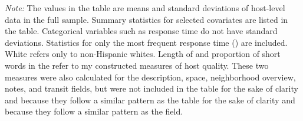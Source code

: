 \begin{table}[htbp]
\begin{center}
\begin{minipage}{6in}
{\it Note:} The values in the table are means and standard deviations of host-level data in the full sample. Summary statistics for selected covariates are listed in the table. Categorical variables such as response time do not have standard deviations. Statistics for only the most frequent response time () are included. White refers only to non-Hispanic whites. Length of  and proportion of short words in the  refer to my constructed measures of host quality. These two measures were also calculated for the description, space, neighborhood overview, notes, and transit fields, but were not included in the table for the sake of clarity and because they follow a similar pattern as the table for the sake of clarity and because they follow a similar pattern as the  field.
\end{minipage}
\end{center}
\end{table}
